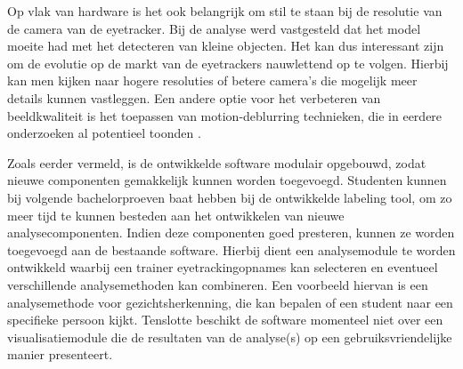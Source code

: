 Op vlak van hardware is het ook belangrijk om stil te staan bij de resolutie van de camera van de eyetracker.
Bij de analyse werd vastgesteld dat het model moeite had met het detecteren van kleine objecten.
Het kan dus interessant zijn om de evolutie op de markt van de eyetrackers nauwlettend op te volgen.
Hierbij kan men kijken naar hogere resoluties of betere camera's die mogelijk meer details kunnen vastleggen.
Een andere optie voor het verbeteren van beeldkwaliteit is het toepassen van motion-deblurring technieken, 
die in eerdere onderzoeken al potentieel toonden \autocite{Cederin2023}.

Zoals eerder vermeld, is de ontwikkelde software modulair opgebouwd, zodat\\ nieuwe componenten gemakkelijk kunnen worden toegevoegd.
Studenten kunnen bij volgende bachelorproeven baat hebben bij de ontwikkelde labeling tool, om zo meer tijd te kunnen besteden aan het ontwikkelen van nieuwe analysecomponenten.
Indien deze componenten goed presteren, kunnen ze worden toegevoegd aan de bestaande software. 
Hierbij dient een analysemodule te worden ontwikkeld waarbij een trainer eyetrackingopnames kan selecteren en eventueel verschillende analysemethoden kan combineren.
Een voorbeeld hiervan is een analysemethode voor gezichtsherkenning, die kan bepalen of een student naar een specifieke persoon kijkt.
Tenslotte beschikt de software momenteel niet over een visualisatiemodule die de resultaten van de analyse(s) op een gebruiksvriendelijke manier presenteert.

